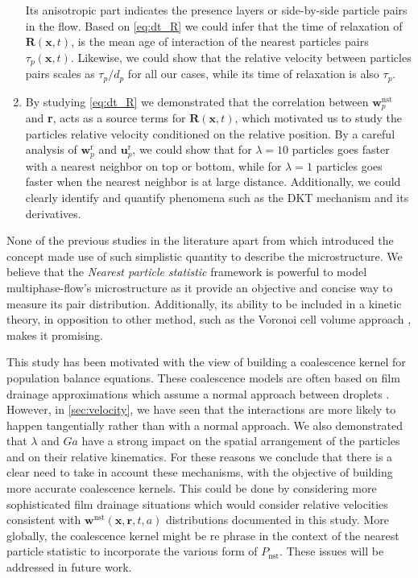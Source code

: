 \begin{enumerate}
    Its anisotropic part indicates the presence layers or side-by-side particle pairs in the flow. 
    Based on \ref{eq:dt_R} we could infer that the time of relaxation of $\textbf{R}(\textbf{x},t)$, is the mean age of interaction of the  nearest particles pairs $\tau_p(\textbf{x},t)$. 
    Likewise, we could show that the relative velocity between particles pairs scales as $\tau_p /d_p$ for all our cases, while its time of relaxation is also $\tau_p$. 
    \item 
    By studying \ref{eq:dt_R} we demonstrated that the correlation between $\textbf{w}_p^\text{nst}$ and \textbf{r}, acts as a source terms for $\textbf{R}(\textbf{x},t)$, which motivated us to study the particles relative velocity conditioned on the relative position. 
    By a careful analysis of $\textbf{w}_p^\text{r}$ and $\textbf{u}_p^\text{r}$, we could show that for $\lambda = 10$ particles goes faster with a nearest neighbor on top or bottom, while for $\lambda = 1$ particles goes faster when the nearest neighbor is at large distance.
    Additionally, we could clearly identify and quantify phenomena such as the DKT mechanism and its derivatives. 
\end{enumerate}
None of the previous studies in the literature apart from \citet{zhang2023evolution} which introduced the concept made use of such simplistic quantity to describe the microstructure. 
We believe that the \textit{Nearest particle statistic} framework is powerful to model multiphase-flow's microstructure as it provide an objective and concise way to measure its pair distribution. 
Additionally, its ability to be included in a kinetic theory, in opposition to other method,  such as the Voronoi cell volume approach \citep{senthil2005voronoi}, makes it promising. 


This study has been motivated with the view of building a coalescence kernel for population balance equations. 
These coalescence models are often based on film drainage approximations which assume a normal approach between droplets \citet{chesters1991modelling}.  
However, in \ref{sec:velocity}, we have seen that the interactions are more likely to happen tangentially rather than with a normal approach. 
We also demonstrated that $\lambda$ and $Ga$ have a strong impact on the spatial arrangement of the particles and on their relative kinematics. 
For these reasons we conclude that there is a clear need to take in account these mechanisms, with the objective of building more accurate coalescence kernels. 
This could be done by considering more sophisticated film drainage situations which would consider relative velocities consistent with $\textbf{w}^\text{nst}(\textbf{x},\textbf{r},t,a)$ distributions documented in this study.
More globally, the coalescence kernel might be re phrase in the context of the nearest particle statistic to incorporate the various form of $P_\text{nst}$. 
These issues will be addressed in future work.  


